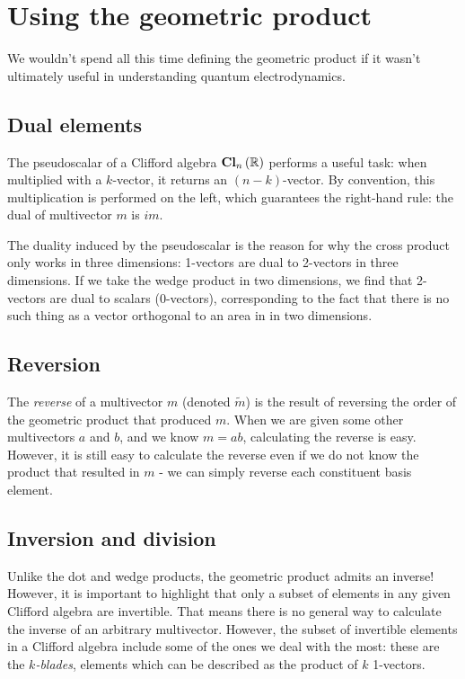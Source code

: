 \section{Using the geometric product}

We wouldn't spend all this time defining the geometric product if it wasn't ultimately useful in
understanding quantum electrodynamics.

\subsection{Dual elements}

The pseudoscalar of a Clifford algebra $\operatorname{\mathbf{Cl}}_{n}\left(\mathbb{R}\right)$ performs a useful task: when multiplied with a
$k$-vector, it returns an $\left(n-k\right)$-vector. By convention, this multiplication is performed
on the left, which guarantees the right-hand rule: the dual of multivector $m$ is $im$.

The duality induced by the pseudoscalar is the reason for why the cross product only works in three
dimensions: 1-vectors are dual to 2-vectors in three dimensions. If we take the wedge product in two
dimensions, we find that 2-vectors are dual to scalars (0-vectors), corresponding to the fact that
there is no such thing as a vector orthogonal to an area in in two dimensions. 

\subsection{Reversion}

The \textit{reverse} of a multivector $m$ (denoted $\tilde{m}$) is the result of reversing the order
of the geometric product that produced $m$. When we are given some other multivectors $a$ and $b$,
and we know $m = ab$, calculating the reverse is easy. However, it is still easy to calculate the
reverse even if we do not know the product that resulted in $m$ - we can simply reverse each
constituent basis element.

\subsection{Inversion and division}

Unlike the dot and wedge products, the geometric product admits an inverse! However, it is important
to highlight that only a subset of elements in any given Clifford algebra are invertible. That means
there is no general way to calculate the inverse of an arbitrary multivector. However, the subset of
invertible elements in a Clifford algebra include some of the ones we deal with the most: these are
the \textit{$k$-blades}, elements which can be described as the product of $k$ 1-vectors.

